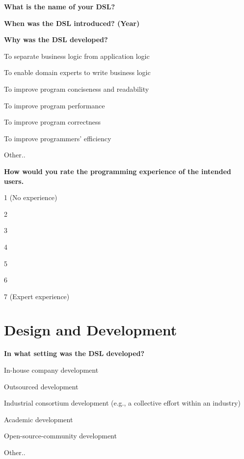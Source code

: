 \documentclass{article}
\begin{document}
\textbf{What is the name of your DSL?} \\
\fbox{\begin{minipage}{15em}
\
\end{minipage}}
\vspace{0.5cm}

\textbf{When was the DSL introduced? (Year)} \\
\fbox{\begin{minipage}{15em}
\
\end{minipage}}
\pagebreak

\textbf{Why was the DSL developed?}
\begin{checklist}
  \item To separate business logic from application logic
  \item To enable domain experts to write business logic
  \item To improve program conciseness and readability
  \item To improve program performance
  \item To improve program correctness
  \item To improve programmers' efficiency
  \item Other..
\end{checklist}
\vspace{0.5cm}

\textbf{How would you rate the programming experience of the intended users.}
\begin{radio}
  \item 1 (No experience)
  \item 2
  \item 3
  \item 4
  \item 5
  \item 6
  \item 7 (Expert experience)
\end{radio}

\section*{Design and Development}

\textbf{In what setting was the DSL developed?}
\begin{checklist}
  \item In-house company development
  \item Outsourced development
  \item Industrial consortium development (e.g., a collective effort within an industry)
  \item Academic development
  \item Open-source-community development
  \item Other..
\end{checklist}
\vspace{0.5cm}
\end{document}
